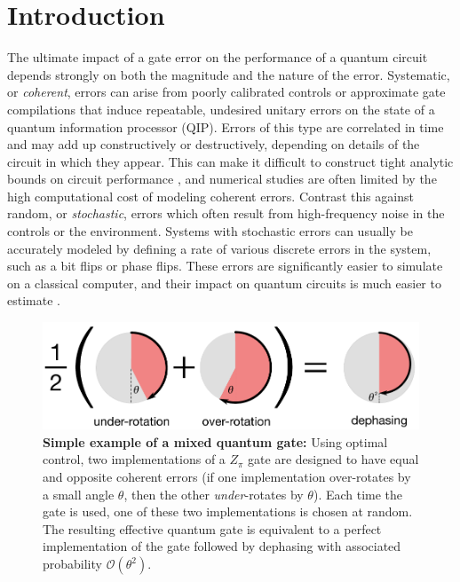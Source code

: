 \documentclass[aps,nofootinbib,pra,notitlepage,twocolumn]{revtex4-1}
\newcommand{\order}[1]{\mathcal{O}\left( #1 \right)}
\newcommand{\0}{\ensuremath{\mathbf{0}}}
\begin{document}
\section{Introduction}
\label{sec:introduction}
\noindent The ultimate impact of a gate error on the performance of a quantum circuit depends strongly on both the magnitude and the nature of the error. Systematic, or \emph{coherent}, errors can arise from poorly calibrated controls or approximate gate compilations that induce repeatable, undesired unitary errors on the state of a quantum information processor (QIP). Errors of this type are correlated in time and may add up constructively or destructively, depending on details of the circuit in which they appear. This can make it difficult to construct tight analytic bounds on circuit performance \cite{Beale2018}, and numerical studies are often limited by the high computational cost of modeling coherent errors. Contrast this against random, or \emph{stochastic}, errors which often result from high-frequency noise in the controls or the environment. Systems with stochastic errors can usually be accurately modeled by defining a rate of various discrete errors in the system, such as a bit flips or phase flips. These errors are significantly easier to simulate on a classical computer, and their impact on quantum circuits is much easier to estimate \cite{Beale2018}.

\begin{figure}[t]
  \centering
  \includegraphics[width=\columnwidth]{simple_example.pdf}
  \caption{\textbf{Simple example of a mixed quantum gate:} Using optimal control, two implementations of a $Z_\pi$ gate are designed to have equal and opposite coherent errors (if one implementation over-rotates by a small angle $\theta$, then the other \emph{under}-rotates by $\theta$). Each time the gate is used, one of these two implementations is chosen at random. The resulting effective quantum gate is equivalent to a perfect implementation of the gate followed by dephasing with associated probability $\order{\theta^2}$.}
  \label{fig:simple_example}
\end{figure}
\end{document}
